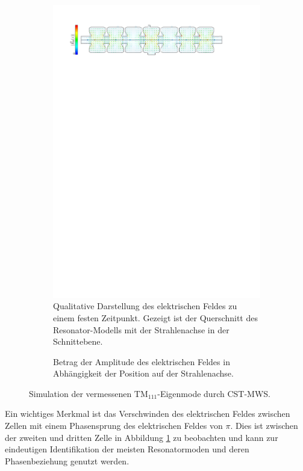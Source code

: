 \begin{figure}[h]
	\centering
	\begin{subfigure}{1\textwidth}
		\centering
		\includegraphics[width=1.0\textwidth]{./figs/TM111-CST/TM111_legende.pdf}
		\caption{Qualitative Darstellung des elektrischen Feldes zu einem festen Zeitpunkt. Gezeigt ist der Querschnitt des Resonator-Modells mit der Strahlenachse in der Schnittebene.}
	\end{subfigure}
	\begin{subfigure}{1\textwidth}
		\centering
		\hspace*{3.5mm}
		\caption{Betrag der Amplitude des elektrischen Feldes in Abhängigkeit der Position auf der Strahlenachse.}
	\end{subfigure}
	\caption[Simulation der $\mathrm{TM}_{111}$-Eigenmode des PETRA-Resonators durch CST-MWS]{Simulation der vermessenen $\mathrm{TM}_{111}$-Eigenmode durch CST-MWS.}
	\label{fig:cst_sim_tm111}
\end{figure}
Ein wichtiges Merkmal ist das Verschwinden des elektrischen Feldes zwischen Zellen mit einem Phasensprung des elektrischen Feldes von $\pi$.
Dies ist zwischen der zweiten und dritten Zelle in Abbildung \ref{fig:cst_sim_tm111} zu beobachten und kann zur eindeutigen Identifikation der meisten Resonatormoden und deren Phasenbeziehung genutzt werden.

